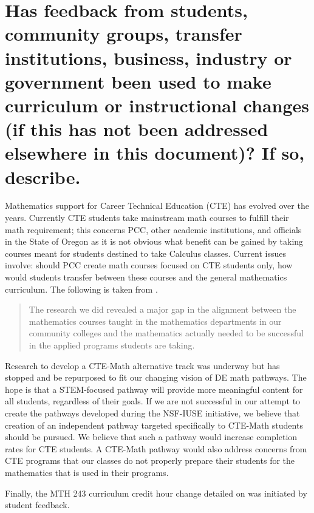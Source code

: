 \section[Curriculum/instructional changes due to internal/external
feedback]{Has feedback from students, community groups, transfer institutions,
	business, industry or government been used to make curriculum or instructional
	changes (if this has not been addressed elsewhere in this document)?  If so,
describe. }
Mathematics support for Career Technical Education (CTE) has evolved over the
years.  Currently CTE students take mainstream math courses to fulfill their
math requirement;  this concerns PCC, other academic institutions, and
officials in the State of Oregon as it is not obvious what benefit can be gained
by taking courses meant for students destined to take Calculus classes. Current issues involve: should PCC create
math courses focused on CTE students only, how would students  transfer between
these courses and the general mathematics curriculum.   The following is taken
from \cite{natcentereduc}.
\begin{quote}
	The research we did revealed a major gap in the alignment between the
	mathematics courses taught in the mathematics departments in our community
	colleges and the mathematics actually needed to be successful in the applied
	programs students are taking.
\end{quote}
Research to develop a CTE-Math alternative track was underway but has stopped
and be repurposed to fit our changing vision of DE math pathways.  The hope is
that a STEM-focused  pathway will provide more meaningful content for all
students, regardless of their goals.
If we are not successful in our attempt to create the pathways developed during
the NSF-IUSE initiative, we believe that creation of an independent pathway
targeted specifically to CTE-Math students should be pursued.  We believe that
such a pathway would increase completion rates for
CTE students. A CTE-Math pathway would also address concerns from CTE programs that our classes
do not properly prepare their students for the mathematics that is used in
their programs.

Finally, the MTH 243 curriculum credit hour change detailed on 
was initiated by student feedback.
